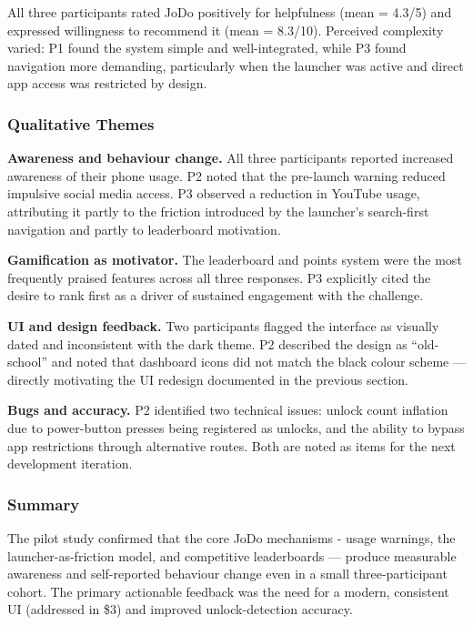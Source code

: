 \documentclass[12pt]{article}
\begin{document}
\noindent All three participants rated JoDo positively for helpfulness (mean = 4.3/5) and expressed willingness to recommend it (mean = 8.3/10). Perceived complexity varied: P1 found the system simple and well-integrated, while P3 found navigation more demanding, particularly when the launcher was active and direct app access was restricted by design.

\subsubsection{Qualitative Themes}

\noindent\textbf{Awareness and behaviour change.} All three participants reported increased awareness of their phone usage. P2 noted that the pre-launch warning reduced impulsive social media access. P3 observed a reduction in YouTube usage, attributing it partly to the friction introduced by the launcher's search-first navigation and partly to leaderboard motivation.

\noindent\textbf{Gamification as motivator.} The leaderboard and points system were the most frequently praised features across all three responses. P3 explicitly cited the desire to rank first as a driver of sustained engagement with the challenge.

\noindent\textbf{UI and design feedback.} Two participants flagged the interface as visually dated and inconsistent with the dark theme. P2 described the design as ``old-school'' and noted that dashboard icons did not match the black colour scheme — directly motivating the UI redesign documented in the previous section.

\noindent\textbf{Bugs and accuracy.} P2 identified two technical issues: unlock count inflation due to power-button presses being registered as unlocks, and the ability to bypass app restrictions through alternative routes. Both are noted as items for the next development iteration.

\subsubsection{Summary}

The pilot study confirmed that the core JoDo mechanisms - usage warnings, the launcher-as-friction model, and competitive leaderboards — produce measurable awareness and self-reported behaviour change even in a small three-participant cohort. The primary actionable feedback was the need for a modern, consistent UI (addressed in \$3) and improved unlock-detection accuracy.
\end{document}
